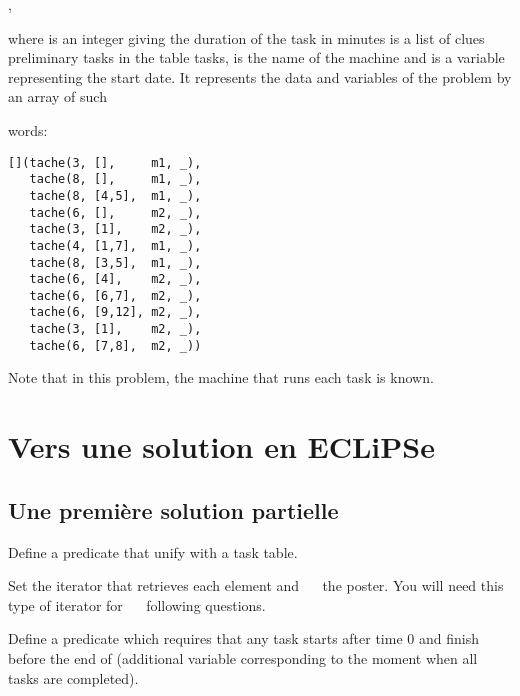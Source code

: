 \begin{center}
    ,
\end{center}
where  is an integer giving the duration of the task in minutes
 is a list of clues preliminary tasks in the table
tasks,
  is the name of the machine and  is a
variable representing the start date.
It represents the data and variables of the problem by an array of such

words:
\begin{center}
\begin{verbatim}
[](tache(3, [],     m1, _),
   tache(8, [],     m1, _),
   tache(8, [4,5],  m1, _),
   tache(6, [],     m2, _),
   tache(3, [1],    m2, _),
   tache(4, [1,7],  m1, _),
   tache(8, [3,5],  m1, _),
   tache(6, [4],    m2, _),
   tache(6, [6,7],  m2, _),
   tache(6, [9,12], m2, _),
   tache(3, [1],    m2, _),
   tache(6, [7,8],  m2, _))
\end{verbatim}
\end{center}

Note that in this problem, the machine that runs each task is known.

\section{Vers une solution en ECLiPSe}
\label{sec:vers-une-solutionOrdo}

\subsection{Une première solution partielle}
\begin{question} \label{TP2_Q1}
Define a predicate  that unify  with a task table.
\end{question}

\begin{question}
  Set the iterator that retrieves each element and
   the poster. You will need this type of iterator for
   following questions.
\end{question}


\begin{question} \label{TP2_Q2}
Define a predicate  which requires that any task  starts after time 0 and
finish before the end of (additional variable corresponding to the moment when all tasks are completed).
\end{question}

